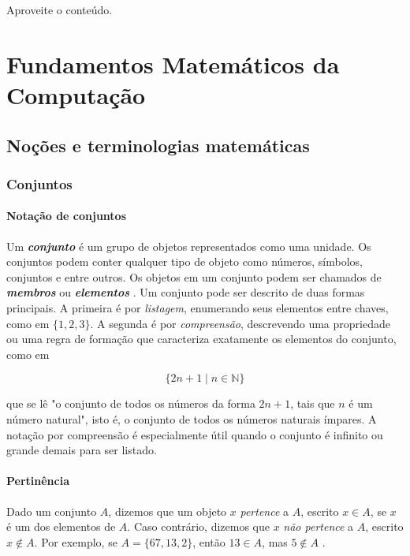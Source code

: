 \documentclass[a4paper,12pt]{article}
\begin{document}
Aproveite o conteúdo.

\newpage

\section{Fundamentos Matemáticos da Computação}

\subsection{Noções e terminologias matemáticas}

\subsubsection{Conjuntos}

\paragraph{Notação de conjuntos}

Um \textit{\textbf{conjunto}} é um grupo de objetos representados como uma unidade. Os conjuntos podem conter qualquer tipo de objeto como números, símbolos, conjuntos e entre outros. 
Os objetos em um conjunto podem ser chamados de \textit{\textbf{membros}} ou \textit{\textbf{elementos}} \cite{sipser}. Um conjunto pode ser descrito de duas formas principais. A primeira é por 
\textit{listagem}, enumerando seus elementos entre chaves, como em $\{1,2,3\}$. A segunda é por \textit{compreensão}, descrevendo uma propriedade ou uma regra de formação que caracteriza 
exatamente os elementos do conjunto, como em

\[
    \{2n+1 \mid n \in \mathbb{N}\}
\]

que se lê "o conjunto de todos os números da forma $2n+1$, tais que $n$ é um número natural", isto é, o conjunto de todos os números naturais ímpares. A notação por compreensão é 
especialmente útil quando o conjunto é infinito ou grande demais para ser listado.


\paragraph{Pertinência}

Dado um conjunto $A$, dizemos que um objeto $x$ \textit{pertence} a $A$, escrito $x \in A$, se $x$ é um dos elementos de $A$. Caso contrário, dizemos que $x$ \textit{não pertence} a $A$, 
escrito $x \notin A$. Por exemplo, se $A = \{67,13,2\}$, então $13 \in A$, mas $5 \notin A$ \cite{murakami}.
\end{document}
